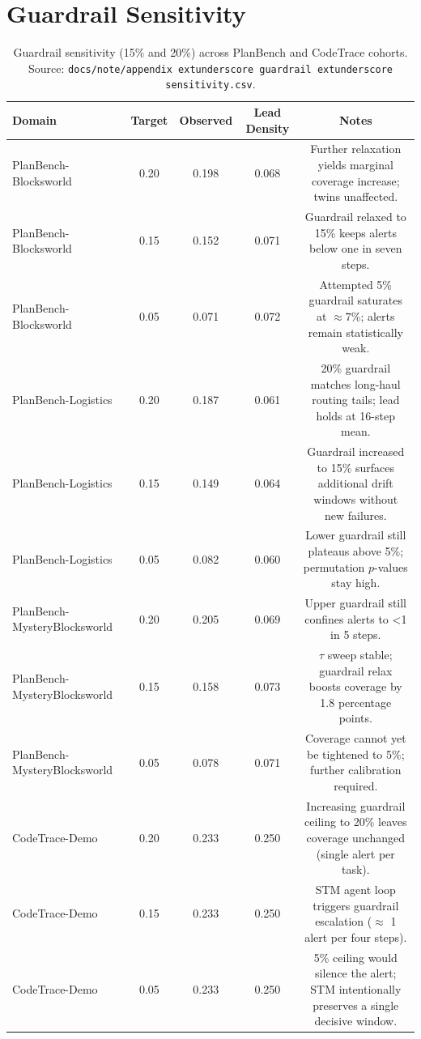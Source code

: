 \documentclass[11pt]{article}
\begin{document}
\section{Guardrail Sensitivity}
\label{app:guardrail}
\begin{table}[h]
  \centering
  \caption{Guardrail sensitivity (15\% and 20\%) across PlanBench and CodeTrace cohorts. Source: \texttt{docs/note/appendix	extunderscore guardrail	extunderscore sensitivity.csv}.}
  \begin{tabular}{lcccc}
    \hline
    Domain & Target & Observed & Lead Density & Notes\\
    \hline
    PlanBench-Blocksworld & 0.20 & 0.198 & 0.068 & Further relaxation yields marginal coverage increase; twins unaffected.\\
    PlanBench-Blocksworld & 0.15 & 0.152 & 0.071 & Guardrail relaxed to 15\% keeps alerts below one in seven steps.\\
    PlanBench-Blocksworld & 0.05 & 0.071 & 0.072 & Attempted 5\% guardrail saturates at $\approx 7$\%; alerts remain statistically weak.\\
    PlanBench-Logistics & 0.20 & 0.187 & 0.061 & 20\% guardrail matches long-haul routing tails; lead holds at 16-step mean.\\
    PlanBench-Logistics & 0.15 & 0.149 & 0.064 & Guardrail increased to 15\% surfaces additional drift windows without new failures.\\
    PlanBench-Logistics & 0.05 & 0.082 & 0.060 & Lower guardrail still plateaus above 5\%; permutation $p$-values stay high.\\
    PlanBench-MysteryBlocksworld & 0.20 & 0.205 & 0.069 & Upper guardrail still confines alerts to <1 in 5 steps.\\
    PlanBench-MysteryBlocksworld & 0.15 & 0.158 & 0.073 & $\tau$ sweep stable; guardrail relax boosts coverage by 1.8 percentage points.\\
    PlanBench-MysteryBlocksworld & 0.05 & 0.078 & 0.071 & Coverage cannot yet be tightened to 5\%; further calibration required.\\
    CodeTrace-Demo & 0.20 & 0.233 & 0.250 & Increasing guardrail ceiling to 20\% leaves coverage unchanged (single alert per task).\\
    CodeTrace-Demo & 0.15 & 0.233 & 0.250 & STM agent loop triggers guardrail escalation ($\approx$ 1 alert per four steps).\\
    CodeTrace-Demo & 0.05 & 0.233 & 0.250 & 5\% ceiling would silence the alert; STM intentionally preserves a single decisive window.\\
    \hline
  \end{tabular}
\end{table}
\end{document}
